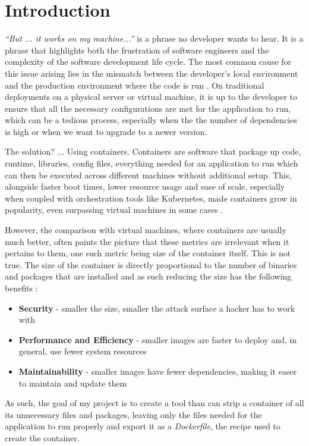 \chapter{Introduction}
\label{chapter:intro}

\textit{“But ... it works on my machine...”} is a phrase no developer wants to hear.
It is a phrase that highlights both the frustration of software engineers and the complexity of
the software development life cycle. The most common cause for this issue arising lies in the
mismatch between the developer's local environment and the production environment where the code is run
\cite{but-it-works-on-my-machine}. On traditional deployments on a physical server or virtual machine, it is
up to the developer to ensure that all the necessary configurations are met for the application to run,
which can be a tedious process, especially when the the number of dependencies is high or when we want to 
upgrade to a newer version.

The solution? ... Using containers. Containers are software that package up code,
runtime, libraries, config files, everything needed for an application to run \cite{what-are-containers} which 
can then be executed across different machines without additional setup. This, alongside
faster boot times, lower resource usage and ease of scale, especially when coupled with orchestration tools like Kubernetes, made containers 
grow in popularity, even surpassing virtual machines in some cases \cite{containers-usage-statistics}.

However, the comparison with virtual machines, where containers are usually much better, often paints the picture that
these metrics are irrelevant when it pertains to them, one such metric being size of the container itself. This is not true.
The size of the container is directly proportional to the number of binaries and packages that are installed and as such
reducing the size has the following benefits \cite{why-keep-containers-small}:
\begin{itemize}
    \item \textbf{Security} - smaller the size, smaller the attack surface a hacker has to work with
    \item \textbf{Performance and Efficiency} - smaller images are faster to deploy and, in general, use fewer system resources
    \item \textbf{Maintainability} - smaller images have fewer dependencies, making it easer to maintain and update them
\end{itemize}

As such, the goal of my project is to create a tool than can strip a container of all its unnecessary files and packages,
leaving only the files needed for the application to run properly and export it as a \textit{Dockerfile}, the recipe used to create the container.
 